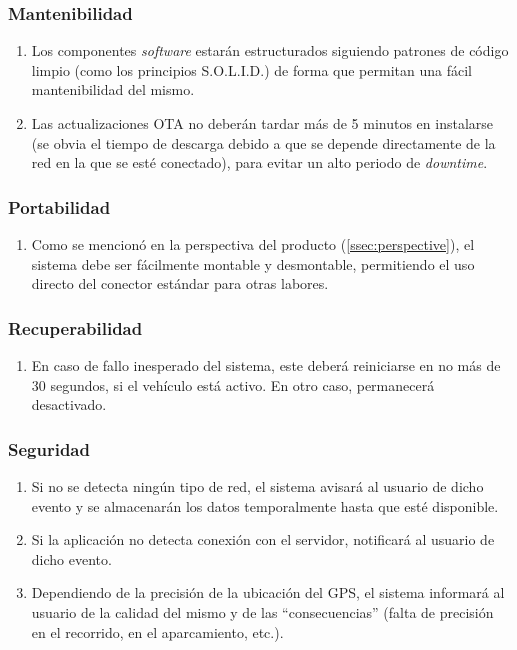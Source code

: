 \subsubsection{Mantenibilidad}
\begin{enumerate}[resume, label=\textbf{\texttt{RNF-\arabic*}}]
  \item\label{nf:solid} Los componentes \textit{software} estarán estructurados
  siguiendo patrones de código limpio (como los principios S.O.L.I.D.) de forma
  que permitan una fácil mantenibilidad del mismo.
  \item\label{nf:ota-time} Las actualizaciones OTA no deberán tardar más de
  5 minutos en instalarse (se obvia el tiempo de descarga debido a que se depende
  directamente de la red en la que se esté conectado), para evitar un alto periodo
  de \textit{downtime}.
\end{enumerate}

\subsubsection{Portabilidad}
\begin{enumerate}[resume, label=\textbf{\texttt{RNF-\arabic*}}]
  \item\label{nf:easy-conn} Como se mencionó en la perspectiva del producto (\ref{ssec:perspective}),
  el sistema debe ser fácilmente montable y desmontable, permitiendo el uso directo
  del conector estándar para otras labores.
\end{enumerate}

\subsubsection{Recuperabilidad}
\begin{enumerate}[resume, label=\textbf{\texttt{RNF-\arabic*}}]
  \item\label{nf:restart-time} En caso de fallo inesperado del sistema, este
  deberá reiniciarse en no más de 30 segundos, si el vehículo está activo. En otro
  caso, permanecerá desactivado.
\end{enumerate}

\subsubsection{Seguridad}
\begin{enumerate}[resume, label=\textbf{\texttt{RNF-\arabic*}}]
  \item\label{nf:err-mobile} Si no se detecta ningún tipo de red, el sistema
  avisará al usuario de dicho evento y se almacenarán los datos temporalmente hasta
  que esté disponible.
  \item\label{nf:err-app} Si la aplicación no detecta conexión con el servidor,
  notificará al usuario de dicho evento.
  \item\label{nf:err-gps} Dependiendo de la precisión de la ubicación del GPS,
  el sistema informará al usuario de la calidad del mismo y de las ``consecuencias''
  (falta de precisión en el recorrido, en el aparcamiento, etc.).
\end{enumerate}

